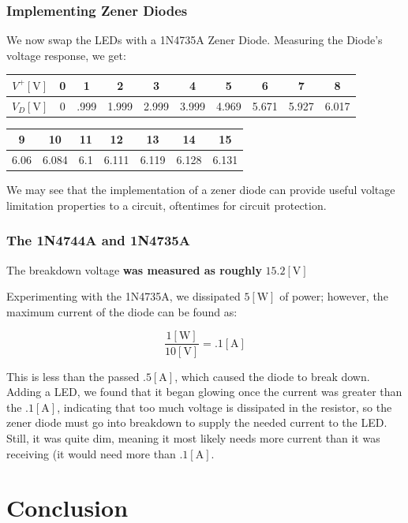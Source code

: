 \documentclass[
	letterpaper, %
	10pt, %
]{CSUniSchoolLabReport}
\begin{document}
    \subsubsection{Implementing Zener Diodes}

    We now swap the LEDs with a 1N4735A Zener Diode. Measuring the Diode's voltage response, we get:

    \begin{center}
    \begin{tabular}[H]{|c|c|c|c|c|c|c|c|c|c|}
      \hline
      $V^{+}[\si{\volt}]$ & 0 & 1 & 2 & 3 & 4 & 5 & 6 & 7 & 8 \\
      \hline
      $V_D[\si{\volt}]$ & 0 & .999 & 1.999 & 2.999 & 3.999 & 4.969 & 5.671 & 5.927 & 6.017\\
      \hline
    \end{tabular}
    \begin{tabular}[H]{|c|c|c|c|c|c|c|}
      \hline
      9 & 10 & 11 & 12 & 13 & 14 & 15\\
      \hline
      6.06 & 6.084 & 6.1 & 6.111 & 6.119 & 6.128 & 6.131\\
      \hline
    \end{tabular}
  \end{center}

  We may see that the implementation of a zener diode can provide useful voltage limitation properties to a circuit, oftentimes for circuit protection. 

  \subsubsection{The 1N4744A and 1N4735A}

  The breakdown voltage \textbf{was measured as roughly} $15.2[\si{\volt}]$

  Experimenting with the 1N4735A, we dissipated $5[\si{\watt}]$ of power; however, the maximum current of the diode can be found as:

  $$\frac{1[\si{\watt}]}{10[\si{\volt}]}=.1[\si{\ampere}]$$

  This is less than the passed $.5[\si{\ampere}]$, which caused the diode to break down. Adding a LED, we found that it began glowing once the current was greater than the $.1[\si{\ampere}]$, indicating that too much voltage is dissipated in the resistor, so the zener diode must go into breakdown to supply the needed current to the LED. Still, it was quite dim, meaning it most likely needs more current than it was receiving (it would need more than $.1[\si{\ampere}]$.

\section{Conclusion}
\end{document}
